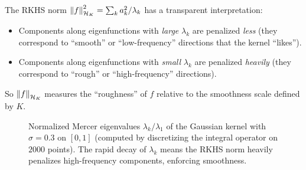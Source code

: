 \begin{notechapter}
\begin{intuition}
The RKHS norm $\left\|f\right\|_{\mathcal{H}_K}^2 = \sum_k a_k^2/\lambda_k$ has a
transparent interpretation:
\begin{itemize}
  \item Components along eigenfunctions with \emph{large} $\lambda_k$
  are penalized \emph{less} (they correspond to ``smooth'' or
  ``low-frequency'' directions that the kernel ``likes'').
  \item Components along eigenfunctions with \emph{small} $\lambda_k$
  are penalized \emph{heavily} (they correspond to ``rough'' or
  ``high-frequency'' directions).
\end{itemize}
So $\left\|f\right\|_{\mathcal{H}_K}$ measures the ``roughness'' of $f$ relative to the
smoothness scale defined by $K$.
\end{intuition}
%
\begin{figure}[h]
\centering
{}
\caption{Normalized Mercer eigenvalues $\lambda_k/\lambda_1$ of the Gaussian kernel with $\sigma = 0.3$ on $[0,1]$ (computed by discretizing the integral operator on $2000$ points). The
rapid decay of $\lambda_k$ means the RKHS norm heavily penalizes
high-frequency components, enforcing smoothness.}
\label{rkhs:fig:mercer_eigenvalues}
\end{figure}


\end{notechapter}
